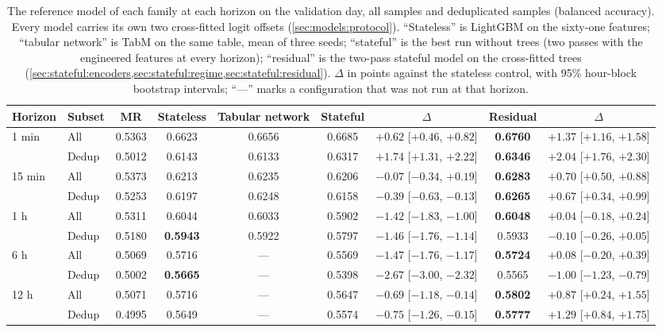 \begin{table}[t]
\centering
\caption{The reference model of each family at each horizon on the validation day, all samples
and deduplicated samples (balanced accuracy).  Every model carries its own two cross-fitted
logit offsets (\cref{sec:models:protocol}).  ``Stateless'' is LightGBM on the sixty-one features; ``tabular
network'' is TabM on the same table, mean of three seeds; ``stateful'' is the best run
without trees (two passes with the engineered features at every horizon); ``residual'' is
the two-pass stateful model on the cross-fitted
trees (\cref{sec:stateful:encoders,sec:stateful:regime,sec:stateful:residual}).  $\Delta$ in points against the stateless control, with 95\% hour-block bootstrap
intervals; ``---'' marks a configuration that was not
run at that horizon.}
\label{tab:horizons:synthesis}
\small
\begin{fittable}\begin{tabular}{llccccccc}
\toprule
Horizon & Subset & MR & Stateless & Tabular network & Stateful & $\Delta$ & Residual & $\Delta$ \\
\midrule
1 min  & All   & 0.5363 & 0.6623 & 0.6656 & 0.6685 & $+0.62$ [$+0.46$, $+0.82$] & \textbf{0.6760} & $+1.37$ [$+1.16$, $+1.58$] \\
       & Dedup & 0.5012 & 0.6143 & 0.6133 & 0.6317 & $+1.74$ [$+1.31$, $+2.22$] & \textbf{0.6346} & $+2.04$ [$+1.76$, $+2.30$] \\
15 min & All   & 0.5373 & 0.6213 & 0.6235 & 0.6206 & $-0.07$ [$-0.34$, $+0.19$] & \textbf{0.6283} & $+0.70$ [$+0.50$, $+0.88$] \\
       & Dedup & 0.5253 & 0.6197 & 0.6248 & 0.6158 & $-0.39$ [$-0.63$, $-0.13$] & \textbf{0.6265} & $+0.67$ [$+0.34$, $+0.99$] \\
1 h    & All   & 0.5311 & 0.6044 & 0.6033 & 0.5902 & $-1.42$ [$-1.83$, $-1.00$] & \textbf{0.6048} & $+0.04$ [$-0.18$, $+0.24$] \\
       & Dedup & 0.5180 & \textbf{0.5943} & 0.5922 & 0.5797 & $-1.46$ [$-1.76$, $-1.14$] & 0.5933 & $-0.10$ [$-0.26$, $+0.05$] \\
6 h    & All   & 0.5069 & 0.5716 & --- & 0.5569 & $-1.47$ [$-1.76$, $-1.17$] & \textbf{0.5724} & $+0.08$ [$-0.20$, $+0.39$] \\
       & Dedup & 0.5002 & \textbf{0.5665} & --- & 0.5398 & $-2.67$ [$-3.00$, $-2.32$] & 0.5565 & $-1.00$ [$-1.23$, $-0.79$] \\
12 h   & All   & 0.5071 & 0.5716 & --- & 0.5647 & $-0.69$ [$-1.18$, $-0.14$] & \textbf{0.5802} & $+0.87$ [$+0.24$, $+1.55$] \\
       & Dedup & 0.4995 & 0.5649 & --- & 0.5574 & $-0.75$ [$-1.26$, $-0.15$] & \textbf{0.5777} & $+1.29$ [$+0.84$, $+1.75$] \\
\bottomrule
\end{tabular}\end{fittable}
\end{table}


